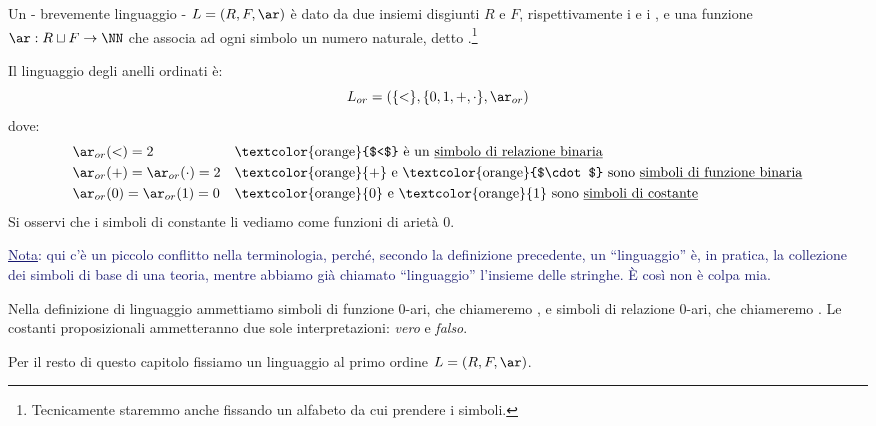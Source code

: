 \begin{definition}
    Un  - brevemente linguaggio - $L = (R,F,\ar)$ è dato da due insiemi disgiunti $R$ e $F$, rispettivamente i  e i , e una funzione
    $\ar : R \sqcup F \to \NN$ che associa ad ogni simbolo un numero naturale, detto .\footnote{Tecnicamente staremmo anche fissando un alfabeto da cui prendere i simboli.}
\end{definition}

\begin{example}
    Il linguaggio degli anelli ordinati è:
    \[ L_{or} = (\{<\},\{0,1,+,\cdot\},\ar_{or})
    \]
    dove:
    \begin{align*}
        &\ar_{or}(<) = 2 &&\text{\textcolor{orange}{$<$} è un \underline{simbolo di relazione binaria}} \\
        &\ar_{or}(+) = \ar_{or}(\cdot) = 2 &&\text{\textcolor{orange}{+} e \textcolor{orange}{$\cdot$} sono \underline{simboli di funzione binaria}} \\
        &\ar_{or}(0) = \ar_{or}(1) = 0 &&\text{\textcolor{orange}{0} e \textcolor{orange}{1} sono \underline{simboli di costante}}
    \end{align*}
    Si osservi che i simboli di constante li vediamo come funzioni di arietà 0.
\end{example}

\textcolor{MidnightBlue}{\underline{Nota}: qui c'è un piccolo conflitto nella terminologia, perché, secondo la definizione precedente, un ``linguaggio'' è, in pratica, la collezione dei simboli di base
di una teoria, mentre abbiamo già chiamato ``linguaggio'' l'insieme delle stringhe. È così non è colpa mia.}

\begin{remark}
    Nella definizione di linguaggio ammettiamo simboli di funzione 0-ari, che chiameremo , e simboli di relazione 0-ari, che chiameremo .
    Le costanti proposizionali ammetteranno due sole interpretazioni: \emph{vero} e \emph{falso}.
\end{remark}

Per il resto di questo capitolo fissiamo un linguaggio al primo ordine $L = (R,F,\ar)$.

